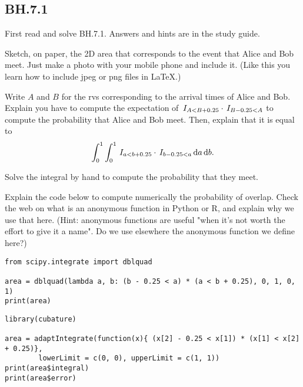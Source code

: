 \subsection{BH.7.1}
\label{sec:bh.7.1}

First read and solve BH.7.1. Answers and hints are in the study guide.


\begin{exercise}\label{ex:ab}
Sketch, on paper, the 2D area that corresponds to the event that Alice and Bob meet. Just make a photo with your mobile phone and include it. (Like this you learn how to include jpeg or png files in \LaTeX.)
\end{exercise}

\begin{exercise}
Write $A$ and $B$ for the rvs corresponding to the arrival times of Alice and Bob.
Explain  you have to compute the expectation of  $\,I_{A<B+0.25}\cdot\,I_{B-0.25 < A}$
to compute the probability that Alice and Bob meet.
Then,  explain that it is equal to
\begin{equation}
\int_0^1\int_0^1 \,I_{a<b+0.25}\cdot \,I_{b-0.25 < a} \,\textrm{d}a \,\textrm{d}b.
\end{equation}
\end{exercise}

\begin{exercise}
Solve the integral by hand to compute  the probability that they meet.
\end{exercise}

\begin{exercise}
Explain the  code below to compute numerically the probability of overlap. Check the web on what is an anonymous function in Python or R, and explain why we use that here.
(Hint: anonymous functions are useful "when it’s not worth the effort to give it a name". Do we use elsewhere the anonymous function we define here?)
\begin{verbatim}
from scipy.integrate import dblquad

area = dblquad(lambda a, b: (b - 0.25 < a) * (a < b + 0.25), 0, 1, 0, 1)
print(area)
\end{verbatim}

\begin{verbatim}
library(cubature)

area = adaptIntegrate(function(x){ (x[2] - 0.25 < x[1]) * (x[1] < x[2] + 0.25)},
        lowerLimit = c(0, 0), upperLimit = c(1, 1))
print(area$integral)
print(area$error)
\end{verbatim}
\end{exercise}

